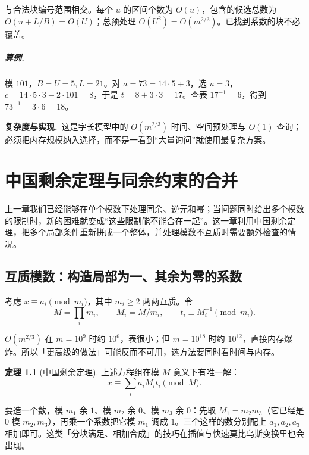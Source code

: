 \documentclass[UTF8,a4paper,11pt,twoside,openright,fontset=fandol]{ctexbook}
\theoremstyle{definition}
\newtheorem{theorem}[definition]{定理}
\newcommand{\cost}{\par\noindent\textbf{复杂度与实现.}\ }
\begin{document}
与合法块编号范围相交。每个 $u$ 的区间个数为 $O(u)$，包含的候选总数为 $O(u+L/B)=O(U)$；总预处理 $O(U^2)=O(m^{2/3})$。已找到系数的块不必覆盖。

\paragraph{算例.} 模 $101$，$B=U=5,L=21$。对 $a=73=14\cdot5+3$，选 $u=3$，$c=14\cdot5\cdot3-2\cdot101=8$，于是 $t=8+3\cdot3=17$。查表 $17^{-1}=6$，得到 $73^{-1}=3\cdot6=18$。
\cost 这是字长模型中的 $O(m^{2/3})$ 时间、空间预处理与 $O(1)$ 查询；必须把内存规模纳入选择，而不是一看到“大量询问”就使用最复杂方案。



\chapter{中国剩余定理与同余约束的合并}
\begin{chapterintro}[章节导读]
上一章我们已经能够在单个模数下处理同余、逆元和幂；当问题同时给出多个模数的限制时，新的困难就变成“这些限制能不能合在一起”。这一章利用中国剩余定理，把多个局部条件重新拼成一个整体，并处理模数不互质时需要额外检查的情况。
\end{chapterintro}

\section{互质模数：构造局部为一、其余为零的系数}
考虑 $x\equiv a_i\pmod{m_i}$，其中 $m_i\ge2$ 两两互质。令
\[
 M=\prod_i m_i,\qquad M_i=M/m_i,\qquad t_i\equiv M_i^{-1}\pmod{m_i}.
\]

\begin{tip}
$O(m^{2/3})$ 在 $m=10^9$ 时约 $10^6$，表很小；但 $m=10^{18}$ 时约 $10^{12}$，直接内存爆炸。所以「更高级的做法」可能反而不可用，选方法要同时看时间与内存。
\end{tip}

\begin{theorem}[中国剩余定理]
上述方程组在模 $M$ 意义下有唯一解：
\[
 x\equiv\sum_i a_iM_it_i\pmod M.
\]
\end{theorem}

\begin{tip}
要造一个数，模 $m_1$ 余 $1$、模 $m_2$ 余 $0$、模 $m_3$ 余 $0$：先取 $M_1=m_2m_3$（它已经是 $0$ 模 $m_2,m_3$），再乘一个系数把它模 $m_1$ 调成 $1$。三个这样的数分别配上 $a_1,a_2,a_3$ 相加即可。这类「分块满足、相加合成」的技巧在插值与快速莫比乌斯变换里也会出现。
\end{tip}
\end{document}
